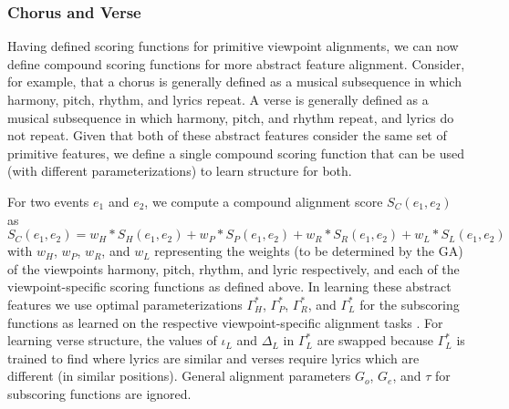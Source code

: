 \documentclass[phd,electronic,oneside,twosidetoc,letterpaper,chaptercenter,parttop,lol,lof,lot]{byumsphd}
\begin{document}
\subsubsection{Chorus and Verse}

Having defined scoring functions for primitive viewpoint alignments, we can now define compound scoring functions for more abstract feature alignment. Consider, for example, that a chorus is generally defined as a musical subsequence in which harmony, pitch, rhythm, and lyrics repeat. A verse is generally defined as a musical subsequence in which harmony, pitch, and rhythm repeat, and lyrics do not repeat. Given that both of these abstract features consider the same set of primitive features, we define a single compound scoring function that can be used (with different parameterizations) to learn structure for both. 

For two events $e_1$ and $e_2$, we compute a compound alignment score $S_C(e_1,e_2)$ as
\[
S_C(e_1,e_2) = w_H * S_H(e_1,e_2) + w_P * S_P(e_1,e_2) + w_R * S_R(e_1,e_2) + w_L * S_L(e_1,e_2)
\]
\noindent with $w_H$, $w_P$, $w_R$, and $w_L$ representing the weights (to be determined by the GA) of the viewpoints harmony, pitch, rhythm, and lyric respectively, and each of the viewpoint-specific scoring functions as defined above. In learning these abstract features we use optimal parameterizations $\Gamma^*_H$, $\Gamma^*_P$, $\Gamma^*_R$, and $\Gamma^*_L$ for the subscoring functions as learned on the respective viewpoint-specific alignment tasks%
. For learning verse structure, the values of $\iota_L$ and $\Delta_L$ in $\Gamma^*_L$ are swapped because $\Gamma^*_L$ is trained to find where lyrics are similar and verses require lyrics which are different (in similar positions). General alignment parameters $G_o$, $G_e$, and $\tau$ for subscoring functions are ignored.
\end{document}
